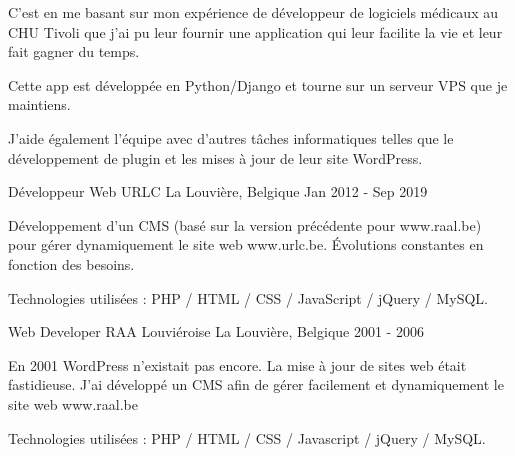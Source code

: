 \begin{cventries}
{    C'est en me basant sur mon expérience de développeur de logiciels médicaux au CHU Tivoli que j'ai pu leur fournir une application qui leur facilite la vie et leur fait gagner du temps.
    
    Cette app est développée en Python/Django et tourne sur un serveur VPS que je maintiens. 
    
    J'aide également l'équipe avec d'autres tâches informatiques telles que le développement de plugin et les mises à jour de leur site WordPress.

    }

  \cventry
    {Développeur Web} %
    {URLC} %
    {La Louvière, Belgique} %
    {Jan 2012 - Sep 2019} %
    {
    Développement d'un CMS (basé sur la version précédente pour www.raal.be) pour gérer dynamiquement le site web www.urlc.be.
    Évolutions constantes en fonction des besoins.

    Technologies utilisées : PHP / HTML / CSS / JavaScript / jQuery / MySQL.

    }

  \cventry
    {Web Developer} %
    {RAA Louviéroise} %
    {La Louvière, Belgique} %
    {2001 - 2006} %
    {
    En 2001 WordPress n'existait pas encore. La mise à jour de sites web était fastidieuse. J'ai développé un CMS afin de gérer facilement et dynamiquement le site web www.raal.be

Technologies utilisées : PHP / HTML / CSS / Javascript / jQuery / MySQL.

    }
\end{cventries}
